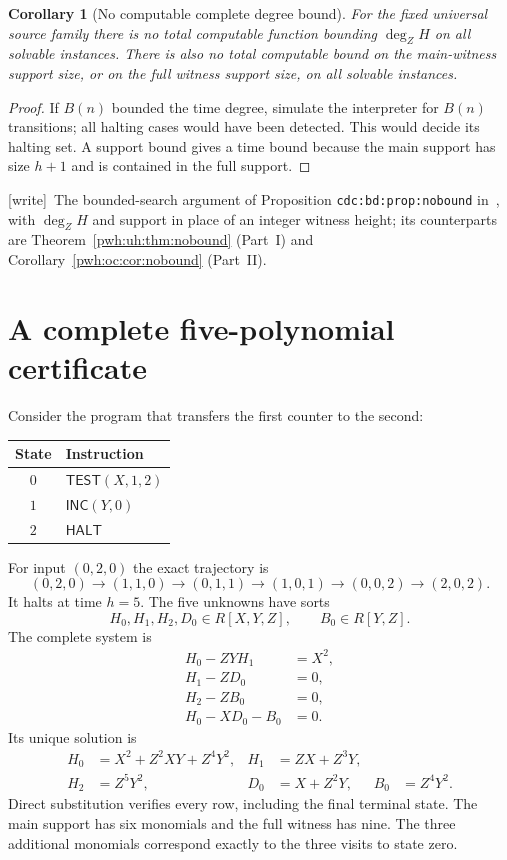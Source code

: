 \documentclass[11pt,letterpaper]{article}
\numberwithin{equation}{section}
\newtheorem{corollary}[theorem]{Corollary}
\theoremstyle{definition}
\newcommand{\inc}{\mathsf{INC}}
\newcommand{\test}{\mathsf{TEST}}
\newcommand{\halt}{\mathsf{HALT}}
\newcommand{\wtag}{\textup{[write]}}
\begin{document}
\begin{corollary}[No computable complete degree bound]\label{pwh:bt:cor:bound}
For the fixed universal source family there is no total computable
function bounding $\deg_Z H$ on all solvable instances. There is also no
total computable bound on the main-witness support size, or on the full
witness support size, on all solvable instances.
\end{corollary}
\begin{proof}
If $B(n)$ bounded the time degree, simulate the interpreter for $B(n)$
transitions; all halting cases would have been detected. This would
decide its halting set. A support bound gives a time bound because the
main support has size $h+1$ and is contained in the full support.
\end{proof}

\wtag\ The bounded-search argument of Proposition
\texttt{cdc:bd:prop:nobound} in~\cite{cdc}, with $\deg_ZH$ and support in
place of an integer witness height; its counterparts are
Theorem~\ref{pwh:uh:thm:nobound} (Part~I) and
Corollary~\ref{pwh:oc:cor:nobound} (Part~II).

\section{A complete five-polynomial certificate}\label{pwh:bt:sec:example}

Consider the program that transfers the first counter to the second:
\begin{center}
\begin{tabular}{@{}cl@{}}
\toprule
State & Instruction\\
\midrule
$0$ & $\test(X,1,2)$\\
$1$ & $\inc(Y,0)$\\
$2$ & $\halt$\\
\bottomrule
\end{tabular}
\end{center}
For input $(0,2,0)$ the exact trajectory is
\[
 (0,2,0)\to(1,1,0)\to(0,1,1)\to(1,0,1)
 \to(0,0,2)\to(2,0,2).
\]
It halts at time $h=5$. The five unknowns have sorts
\[
 H_0,H_1,H_2,D_0\in R[X,Y,Z],\qquad B_0\in R[Y,Z].
\]
The complete system is
\begin{align}
 H_0-ZYH_1&=X^2,\label{pwh:bt:eq:example0}\\
 H_1-ZD_0&=0,\\
 H_2-ZB_0&=0,\\
 H_0-XD_0-B_0&=0.\label{pwh:bt:eq:example3}
\end{align}
Its unique solution is
\begin{align}
 H_0&=X^2+Z^2XY+Z^4Y^2,&
 H_1&=ZX+Z^3Y,\label{pwh:bt:eq:example-sol}\\
 H_2&=Z^5Y^2,&
 D_0&=X+Z^2Y,& B_0&=Z^4Y^2.\nonumber
\end{align}
Direct substitution verifies every row, including the final terminal
state. The main support has six monomials and the full witness has
nine. The three additional monomials correspond exactly to the three
visits to state zero.
\end{document}
